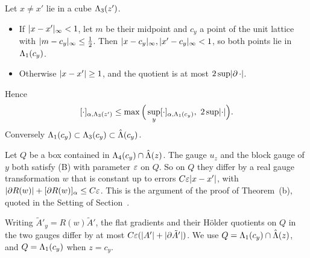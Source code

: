 \begin{detail}
\begin{step}
Let $x\ne x'$ lie in a cube $\Lambda_3(z')$.
\begin{itemize}
\item If $\lvert x-x'\rvert_\infty<1$, let $m$ be their midpoint and $c_y$ a point of the unit lattice with $\lvert m-c_y\rvert_\infty\le\frac12$. Then $\lvert x-c_y\rvert_\infty,\lvert x'-c_y\rvert_\infty<1$, so both points lie in $\Lambda_1(c_y)$.
\item Otherwise $\lvert x-x'\rvert\ge1$, and the quotient is at most $2\sup\lvert\partial\,\cdot\rvert$.
\end{itemize}
Hence
\[
\Hol{\cdot}{\Lam_3(z')}\le\max\Big(\sup_y\Hol{\cdot}{\Lam_1(c_y)},\ 2\sup\xaabs{\cdot}\Big).
\]
Conversely $\Lambda_1(c_y)\subset\Lambda_3(c_y)\subset\hat{\Lambda}(c_y)$.
\end{step}

\begin{step}
Let $Q$ be a box contained in $\Lambda_4(c_y)\cap\hat{\Lambda}(z)$. The gauge $u_z$ and the block gauge of $y$ both satisfy (B) with parameter $\varepsilon$ on $Q$. So on $Q$ they differ by a real gauge transformation $w$ that is constant up to errors $C\varepsilon\lvert x-x'\rvert$, with $\lvert\partial R(w)\rvert+[\partial R(w)]_\alpha\le C\varepsilon$. This is the argument of the proof of Theorem~(b), quoted in the Setting of Section~.

Writing $\tilde A'_y=R(w)\tilde A'$, the flat gradients and their H\"older quotients on $Q$ in the two gauges differ by at most $C\varepsilon(\lvert A'\rvert+\lvert\partial\tilde A'\rvert)$. We use $Q=\Lambda_1(c_y)\cap\hat{\Lambda}(z)$, and $Q=\Lambda_1(c_y)$ when $z=c_y$.
\end{step}


\end{detail}

